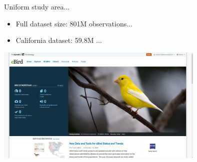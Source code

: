 \documentclass{beamer}
\begin{document}
\begin{frame}{Uniform study area...}
    \begin{itemize}
        \item Full dataset size: 801M  observations...
        \item California dataset: 59.8M ...
    \end{itemize} \vspace{0.5cm}
    \centering
    \includegraphics[width=0.75\textwidth]{figures/ebird}
\end{frame}
\end{document}
